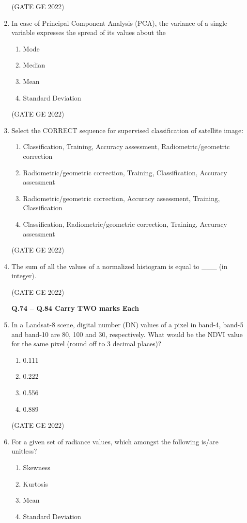 \documentclass[journal,12pt,onecolumn]{IEEEtran}
\theoremstyle{remark}
\begin{document}
\begin{enumerate}
\hfill (GATE GE 2022)

\item In case of Principal Component Analysis (PCA), the variance of a single variable expresses the spread of its values about the
\begin{enumerate}
    \item Mode
    \item Median
    \item Mean
    \item Standard Deviation
\end{enumerate}

\hfill (GATE GE 2022)

\item Select the CORRECT sequence for supervised classification of satellite image:
\begin{enumerate}
    \item Classification, Training, Accuracy assessment, Radiometric/geometric correction
    \item Radiometric/geometric correction, Training, Classification, Accuracy assessment
    \item Radiometric/geometric correction, Accuracy assessment, Training, Classification
    \item Classification, Radiometric/geometric correction, Training, Accuracy assessment
\end{enumerate}

\hfill (GATE GE 2022)

\item The sum of all the values of a normalized histogram is equal to \_\_\_ (in integer).

\hfill (GATE GE 2022)

\textbf{Q.74 – Q.84 Carry TWO marks Each}

\item In a Landsat-8 scene, digital number (DN) values of a pixel in band-4, band-5 and band-10 are 80, 100 and 30, respectively. What would be the NDVI value for the same pixel (round off to 3 decimal places)?
\begin{enumerate}
    \item 0.111
    \item 0.222
    \item 0.556
    \item 0.889
\end{enumerate}

\hfill (GATE GE 2022)

\item For a given set of radiance values, which amongst the following is/are unitless?
\begin{enumerate}
    \item Skewness
    \item Kurtosis
    \item Mean
    \item Standard Deviation
\end{enumerate}


\end{enumerate}
\end{document}

